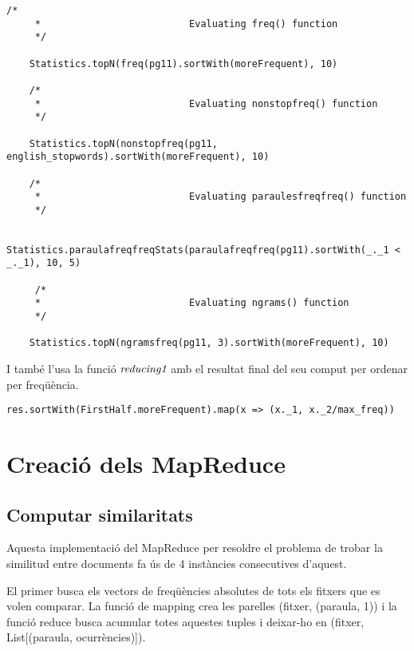 \documentclass{report}
\begin{document}
\begin{lstlisting}[style=scalaHighlight]
/*
     * 							Evaluating freq() function
     */

    Statistics.topN(freq(pg11).sortWith(moreFrequent), 10)

    /*
     * 							Evaluating nonstopfreq() function
     */

    Statistics.topN(nonstopfreq(pg11, english_stopwords).sortWith(moreFrequent), 10)

    /*
     * 							Evaluating paraulesfreqfreq() function
     */

    Statistics.paraulafreqfreqStats(paraulafreqfreq(pg11).sortWith(_._1 < _._1), 10, 5)

     /*
     * 							Evaluating ngrams() function
     */

    Statistics.topN(ngramsfreq(pg11, 3).sortWith(moreFrequent), 10)
\end{lstlisting}

I també l'usa la funció $ \emph{reducing1} $ amb el resultat final del seu comput per ordenar per freqüència.

\begin{lstlisting}[style=scalaHighlight]
    res.sortWith(FirstHalf.moreFrequent).map(x => (x._1, x._2/max_freq))
\end{lstlisting}

\chapter{Creació dels MapReduce}

\section{Computar similaritats}

Aquesta implementació del MapReduce per resoldre el problema de trobar la similitud entre documents fa ús de 4 instàncies consecutives d'aquest. 

El primer busca els vectors de freqüències absolutes de tots els fitxers que es volen comparar. La funció de mapping crea les parelles (fitxer, (paraula, 1)) i la funció reduce busca acumular totes aquestes tuples i deixar-ho en (fitxer, List[(paraula, ocurrències)]).
\end{document}
